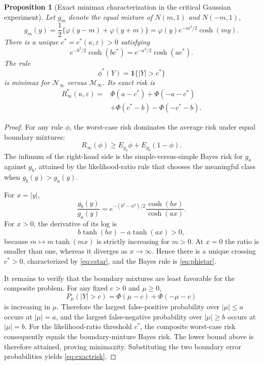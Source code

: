 \documentclass[11pt]{article}
\newtheorem{proposition}{Proposition}
\theoremstyle{remark}
\begin{document}
\begin{proposition}[Exact minimax characterization in the critical Gaussian experiment]
\label{prop:critical-exact}
Let $g_m$ denote the equal mixture of $N(m,1)$ and $N(-m,1)$,
\[
g_m(y)=\frac12\{\varphi(y-m)+\varphi(y+m)\}
=\varphi(y)e^{-m^2/2}\cosh(my).
\]
There is a unique $c^*=c^*(\kappa,\varepsilon)>0$ satisfying
\begin{equation}
e^{-b^2/2}\cosh(bc^*)
=
e^{-a^2/2}\cosh(ac^*).
\label{eq:cstar}
\end{equation}
The rule
\begin{equation}
\phi^*(Y)=\mathbf1\{|Y|>c^*\}
\label{eq:phistar}
\end{equation}
is minimax for $\mathcal N_\infty$ versus $\mathcal M_\infty$. Its exact risk is
\begin{equation}
\begin{aligned}
R_\infty^*(\kappa,\varepsilon)
={}&\Phi(a-c^*)+\Phi(-a-c^*)\\
&+\Phi(c^*-b)-\Phi(-c^*-b).
\end{aligned}
\label{eq:exactrisk}
\end{equation}
\end{proposition}

\begin{proof}
For any rule $\phi$, the worst-case risk dominates the average risk under equal boundary mixtures:
\[
R_\infty(\phi)
\ge
E_{g_a}\phi+E_{g_b}(1-\phi).
\]
The infimum of the right-hand side is the simple-versus-simple Bayes risk for $g_a$ against $g_b$, attained by the likelihood-ratio rule that chooses the meaningful class when $g_b(y)>g_a(y)$.

For $x=|y|$,
\[
\frac{g_b(y)}{g_a(y)}
=
e^{-(b^2-a^2)/2}
\frac{\cosh(bx)}{\cosh(ax)}.
\]
For $x>0$, the derivative of its log is
\[
b\tanh(bx)-a\tanh(ax)>0,
\]
because $m\mapsto m\tanh(mx)$ is strictly increasing for $m>0$. At $x=0$ the ratio is smaller than one, whereas it diverges as $x\to\infty$. Hence there is a unique crossing $c^*>0$, characterized by \eqref{eq:cstar}, and the Bayes rule is \eqref{eq:phistar}.

It remains to verify that the boundary mixtures are least favorable for the composite problem. For any fixed $c>0$ and $\mu\ge0$,
\[
P_\mu(|Y|>c)=\Phi(\mu-c)+\Phi(-\mu-c)
\]
is increasing in $\mu$. Therefore the largest false-positive probability over $|\mu|\le a$ occurs at $|\mu|=a$, and the largest false-negative probability over $|\mu|\ge b$ occurs at $|\mu|=b$. For the likelihood-ratio threshold $c^*$, the composite worst-case risk consequently equals the boundary-mixture Bayes risk. The lower bound above is therefore attained, proving minimaxity. Substituting the two boundary error probabilities yields \eqref{eq:exactrisk}.
\end{proof}
\end{document}
